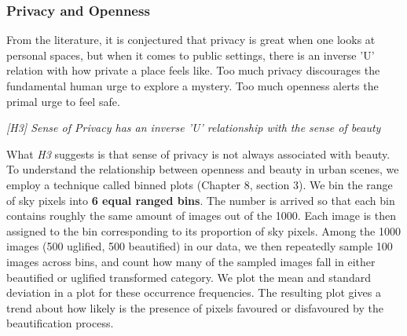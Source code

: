 \subsubsection{Privacy and  Openness }
\label{sec:privacy}

From the literature, it is conjectured that privacy is great when one
looks at personal spaces, but when it comes to public settings, there is an inverse 'U' relation with how private a place feels like. 
Too much privacy discourages the fundamental human urge to explore a mystery. Too much openness  alerts the primal urge to feel safe. 
\par
\textit{[H3] Sense of Privacy has an inverse 'U' relationship with the sense of beauty }
\par
What \textit{H3} suggests is that sense of privacy is not always associated with beauty. 
To understand the relationship between openness and beauty in urban scenes, we employ a technique called binned plots \cite{witten2016data} (Chapter 8, section 3). We bin the range of sky pixels into \textbf{6 equal ranged bins}. The number is arrived so that each bin contains roughly the same amount of images out of the 1000.%
Each image is then assigned to the bin corresponding to its proportion of sky pixels. %
Among the 1000 images (500 uglified, 500 beautified) in our data, we then repeatedly sample 100 images across bins, and count how many of the sampled images fall in either beautified or uglified transformed category. We plot the mean and standard deviation in a plot for these occurrence frequencies. The resulting plot gives a trend about how likely is the presence of pixels favoured or disfavoured by the beautification process. 


